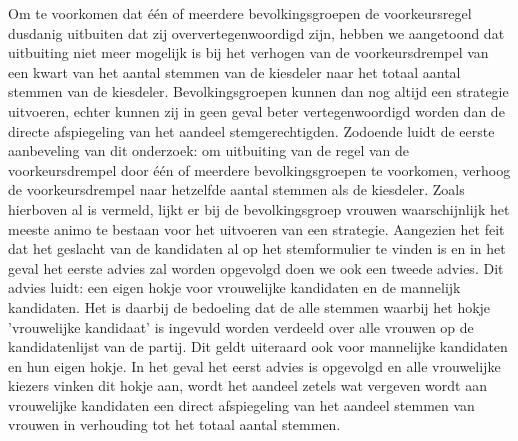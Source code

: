 Om te voorkomen dat één of meerdere bevolkingsgroepen de voorkeursregel dusdanig uitbuiten dat zij oververtegenwoordigd zijn, hebben we aangetoond dat uitbuiting niet meer mogelijk is bij het verhogen van de voorkeursdrempel van een kwart van het aantal stemmen van de kiesdeler naar het totaal aantal stemmen van de kiesdeler. Bevolkingsgroepen kunnen dan nog altijd een strategie uitvoeren, echter kunnen zij in geen geval beter vertegenwoordigd worden dan de directe afspiegeling van het aandeel stemgerechtigden. Zodoende luidt de eerste aanbeveling van dit onderzoek: om uitbuiting van de regel van de voorkeursdrempel door één of meerdere bevolkingsgroepen te voorkomen, verhoog de voorkeursdrempel naar hetzelfde aantal stemmen als de kiesdeler. 
Zoals hierboven al is vermeld, lijkt er bij de bevolkingsgroep vrouwen waarschijnlijk het meeste animo te bestaan voor het uitvoeren van een strategie. Aangezien het feit dat het geslacht van de kandidaten al op het stemformulier te vinden is en in het geval het eerste advies zal worden opgevolgd doen we ook een tweede advies. Dit advies luidt: een eigen hokje voor vrouwelijke kandidaten en de mannelijk kandidaten. Het is daarbij de bedoeling dat de alle stemmen waarbij het hokje 'vrouwelijke kandidaat' is ingevuld worden verdeeld over alle vrouwen op de kandidatenlijst van de partij. Dit geldt uiteraard ook voor mannelijke kandidaten en hun eigen hokje. In het geval het eerst advies is opgevolgd en alle vrouwelijke kiezers vinken dit hokje aan, wordt het aandeel zetels wat vergeven wordt aan vrouwelijke kandidaten een direct afspiegeling van het aandeel stemmen van vrouwen in verhouding tot het totaal aantal stemmen.

